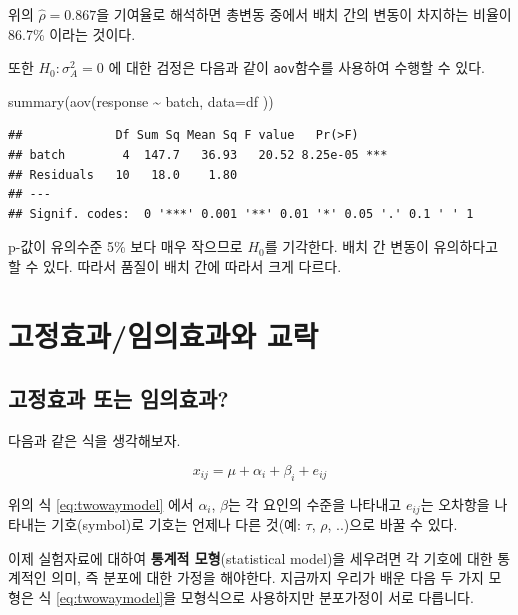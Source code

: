 \documentclass[
]{book}
\newenvironment{Shaded}{\begin{snugshade}}{\end{snugshade}}
\newcommand{\AttributeTok}[1]{\textcolor[rgb]{0.77,0.63,0.00}{#1}}
\newcommand{\FunctionTok}[1]{\textcolor[rgb]{0.00,0.00,0.00}{#1}}
\newcommand{\NormalTok}[1]{#1}
\newcommand{\SpecialCharTok}[1]{\textcolor[rgb]{0.00,0.00,0.00}{#1}}
\theoremstyle{definition}
\theoremstyle{definition}
\theoremstyle{definition}
\theoremstyle{remark}
\begin{document}
위의 \(\hat \rho=0.867\)을 기여율로 해석하면 총변동 중에서 배치 간의 변동이 차지하는 비율이 86.7\% 이라는 것이다.

또한 \(H_0: \sigma_A^2=0\) 에 대한 검정은 다음과 같이 \texttt{aov}함수를 사용하여 수행할 수 있다.

\begin{Shaded}
\begin{Highlighting}[]
\FunctionTok{summary}\NormalTok{(}\FunctionTok{aov}\NormalTok{(response }\SpecialCharTok{\textasciitilde{}}\NormalTok{ batch, }\AttributeTok{data=}\NormalTok{df ))}
\end{Highlighting}
\end{Shaded}

\begin{verbatim}
##             Df Sum Sq Mean Sq F value   Pr(>F)    
## batch        4  147.7   36.93   20.52 8.25e-05 ***
## Residuals   10   18.0    1.80                     
## ---
## Signif. codes:  0 '***' 0.001 '**' 0.01 '*' 0.05 '.' 0.1 ' ' 1
\end{verbatim}

p-값이 유의수준 5\% 보다 매우 작으므로 \(H_0\)를 기각한다. 배치 간 변동이 유의하다고 할 수 있다. 따라서 품질이 배치 간에 따라서 크게 다르다.

\hypertarget{fixedrandom}{%
\chapter{고정효과/임의효과와 교락}\label{fixedrandom}}

\hypertarget{uxace0uxc815uxd6a8uxacfc-uxb610uxb294-uxc784uxc758uxd6a8uxacfc}{%
\section{고정효과 또는 임의효과?}\label{uxace0uxc815uxd6a8uxacfc-uxb610uxb294-uxc784uxc758uxd6a8uxacfc}}

다음과 같은 식을 생각해보자.

\begin{equation}
x_{ij} = \mu + \alpha_i + \beta_i + e_{ij}
\label{eq:twowaymodel}
\end{equation}

위의 식 \eqref{eq:twowaymodel} 에서 \(\alpha_i\), \(\beta\)는 각 요인의 수준을 나타내고 \(e_{ij}\)는 오차항을 나타내는 기호(symbol)로 기호는 언제나 다른 것(예: \(\tau\), \(\rho\), ..)으로 바꿀 수 있다.

이제 실험자료에 대하여 \textbf{통계적 모형}(statistical model)을 세우려면 각 기호에 대한 통계적인 의미, 즉 분포에 대한 가정을 해야한다.
지금까지 우리가 배운 다음 두 가지 모형은 식 \eqref{eq:twowaymodel}을 모형식으로 사용하지만 분포가정이 서로 다릅니다.
\end{document}

